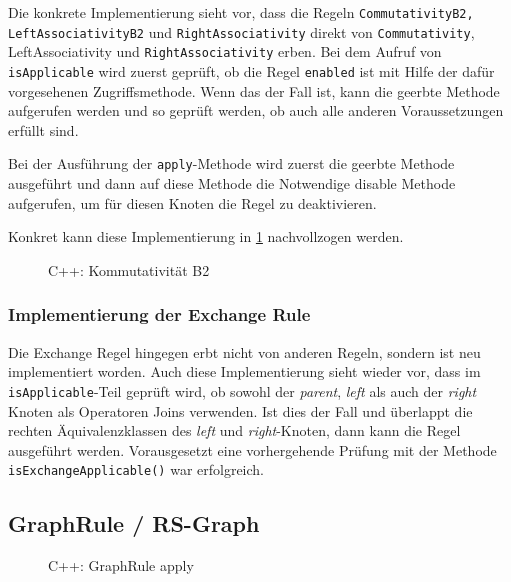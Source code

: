 Die konkrete Implementierung sieht vor, dass die Regeln \texttt{Commutativity\-B2, Left\-Associativity\-B2} und \texttt{Right\-Associativity} direkt von \texttt{Commutativity}, \texttt{}{Left\-Associativity} und \texttt{Right\-Associativity} erben. Bei dem Aufruf von \texttt{is\-Applicable} wird zuerst geprüft, ob die Regel \texttt{enabled} ist mit Hilfe der dafür vorgesehenen Zugriffsmethode. Wenn das der Fall ist, kann die geerbte Methode aufgerufen werden und so geprüft werden, ob auch alle anderen Voraussetzungen erfüllt sind.

Bei der Ausführung der \texttt{apply}-Methode wird  zuerst die geerbte Methode ausgeführt und dann auf diese Methode die Notwendige disable Methode aufgerufen, um für diesen Knoten die Regel zu deaktivieren.

Konkret kann diese Implementierung in \ref{CommutativityB2Code} nachvollzogen werden.


\begin{figure}[ht]

\caption{C++: Kommutativität B2}
\label{CommutativityB2Code}
\end{figure}



\subsubsection{Implementierung der Exchange Rule}
Die Exchange Regel hingegen erbt nicht von anderen Regeln, sondern ist neu implementiert worden. Auch diese Implementierung sieht wieder vor, dass im \texttt{is\-Applicable}-Teil geprüft wird, ob sowohl der \textit{parent}, \textit{left} als auch der \textit{right} Knoten als Operatoren Joins verwenden. Ist dies der Fall und überlappt die rechten Äquivalenzklassen des \textit{left} und \textit{right}-Knoten, dann kann die Regel ausgeführt werden. Vorausgesetzt eine vorhergehende Prüfung mit der Methode \texttt{is\-Exchange\-Applicable()} war erfolgreich. 




\subsection{GraphRule / RS-Graph}

\begin{figure}[ht]

\caption{C++: GraphRule apply}
\label{GraphRuleApply}
\end{figure}

